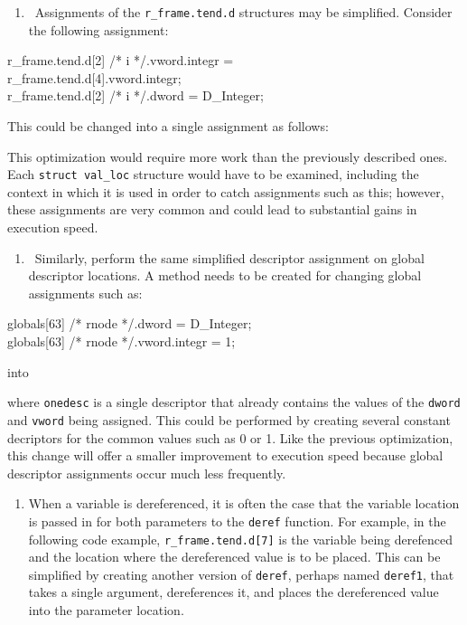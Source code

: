 \liststyleLxxxix
\begin{enumerate}
\item 
\ Assignments of the \texttt{r\_frame.tend.d} structures may be simplified. Consider the following assignment:
\end{enumerate}
\goodbreak
\begin{iconcode}
r\_frame.tend.d[2] /* i */.vword.integr =\\
\>r\_frame.tend.d[4].vword.integr;\\
r\_frame.tend.d[2] /* i */.dword = D\_Integer;\\
\end{iconcode}


This could be changed into a single assignment as follows:



This optimization would require more work than the previously
described ones. Each \texttt{struct val\_loc} structure would have
to be examined, including the context in which it is used in order to
catch assignments such as this; however, these assignments are very
common and could lead to substantial gains in execution speed.

\liststyleLxl
\begin{enumerate}
\item 
\ Similarly, perform the same simplified descriptor assignment on global descriptor locations. A method needs to be
created for changing global assignments such as:
\end{enumerate}
\goodbreak
\begin{iconcode}
globals[63] /* rnode */.dword = D\_Integer;\\
globals[63] /* rnode */.vword.integr = 1;\\
\end{iconcode}

\noindent
into


\noindent where \texttt{onedesc} is a single descriptor that already
contains the values of the \texttt{dword} and \texttt{vword} being
assigned. This could be performed by creating several constant
decriptors for the common values such as 0 or 1.  Like the previous
optimization, this change will offer a smaller improvement to
execution speed because global descriptor assignments occur much less
frequently.

\liststyleLxli
\begin{enumerate}
\item 
When a variable is dereferenced, it is often the case that the variable location is passed in for both parameters to
the \texttt{deref} function. For example, in the following code example, \texttt{r\_frame.tend.d[7]} is the variable
being derefenced and the location where the dereferenced value is to be placed. This can be simplified by creating
another version of \texttt{deref}, perhaps named \texttt{deref1}, that takes a single argument, dereferences it, and
places the dereferenced value into the parameter location.
\end{enumerate}

